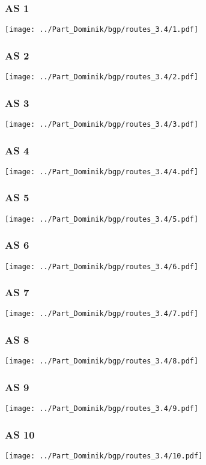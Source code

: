\clearpage
\subsubsection{AS 1}
\texttt{[image: ../Part\_Dominik/bgp/routes\_3.4/1.pdf]}
\clearpage
\subsubsection{AS 2}
\texttt{[image: ../Part\_Dominik/bgp/routes\_3.4/2.pdf]}
\clearpage
\subsubsection{AS 3}
\texttt{[image: ../Part\_Dominik/bgp/routes\_3.4/3.pdf]}
\clearpage
\subsubsection{AS 4}
\texttt{[image: ../Part\_Dominik/bgp/routes\_3.4/4.pdf]}
\clearpage
\subsubsection{AS 5}
\texttt{[image: ../Part\_Dominik/bgp/routes\_3.4/5.pdf]}
\clearpage
\subsubsection{AS 6}
\texttt{[image: ../Part\_Dominik/bgp/routes\_3.4/6.pdf]}
\clearpage
\subsubsection{AS 7}
\texttt{[image: ../Part\_Dominik/bgp/routes\_3.4/7.pdf]}
\clearpage
\subsubsection{AS 8}
\texttt{[image: ../Part\_Dominik/bgp/routes\_3.4/8.pdf]}
\clearpage
\subsubsection{AS 9}
\texttt{[image: ../Part\_Dominik/bgp/routes\_3.4/9.pdf]}
\clearpage
\subsubsection{AS 10}
\texttt{[image: ../Part\_Dominik/bgp/routes\_3.4/10.pdf]}
\clearpage
